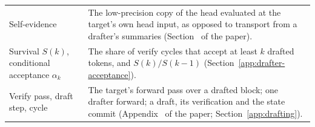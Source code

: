 {\begin{longtable}{@{}P{4.4cm}P{12.1cm}@{}}
Self-evidence & The low-precision copy of the head evaluated at the target's own head input, as opposed to transport from a drafter's summaries (Section~ of the paper).\\
Survival $S(k)$, conditional acceptance $\alpha_k$ & The share of verify cycles that accept at least $k$ drafted tokens, and $S(k)/S(k-1)$ (Section~\ref{app:drafter-acceptance}).\\
Verify pass, draft step, cycle & The target's forward pass over a drafted block; one drafter forward; a draft, its verification and the state commit (Appendix~ of the paper; Section~\ref{app:drafting}).\\
\end{longtable}}
